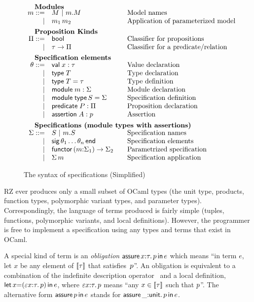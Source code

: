 \begin{figure}
\[\begin{array}{rl@{\qquad}l}
    \noalign{\textbf{Modules}}		
    \om ::= 
    & \oM  \obar \oselect{\om}{\oM}&\mbox{Model names}\\
    | & \oapp{\om_1}{\om_2}&\mbox{Application of parameterized model}\\[5pt]
    
    \noalign{\textbf{Proposition Kinds}}
    \opt ::=
    & \oProp & \mbox{Classifier for propositions}\\
    |& \oarrow{\oty}{\opt} & \mbox{Classifier for a predicate/relation}\\[5pt] 
    
    \noalign{\textbf{Specification elements}}
    \ote ::=
    & \ovalspec{\ox}{\oty}&\mbox{Value declaration}\\
    | & \otyspec{\oTY}&\mbox{Type declaration}\\
    | & \otydef{\oTY}{\oty}&\mbox{Type definition}\\
    | & \omodulespec{\om}{\omt}&\mbox{Module declaration}\\
    | & \osignatdef{\oMT}{\omt}&\mbox{Specification definition}\\
    | & \opropspec{\oP}{\opt}&\mbox{Proposition declaration}\\
    | & \oassertion{\oA}{\op}&\mbox{Assertion}\\[5pt]

    \noalign{\textbf{Specifications (module types with assertions)}}
    \omt ::= 
    & \oMT \obar \oselect{\om}{\oMT} & \mbox{Specification names}\\
    | & \osig{\ote_1 \ldots \ote_n} & \mbox{Specification elements}\\
    | & \ofunctor{\om}{\omt_1}{\omt_2} & \mbox{Parametrized specification}\\
    | & \oapp{\omt}{\om} & \mbox{Specification application}
  \end{array}
  \]
  \label{fig:output}
  \caption{The syntax of specifications (Simplified)}
\end{figure}

RZ ever produces only a small subset of OCaml types (the unit type,
products, function types, polymorphic variant types, and parameter
types). Correspondingly, the language of terms produced is fairly simple
(tuples, functions, polymorphic variants, and local definitions).
However, the programmer is free to implement a specification using any
types and terms that exist in OCaml. 

A special kind of term is an
\emph{obligation} $\mathsf{assure}\,x{:}\tau.\,p\,\mathsf{in}\,e$ which means ``in term
$e$, let $x$ be any element of $[\![\tau]\!]$ that satisfies~$p$''.
An obligation is equivalent to a combination of the indefinite
description operator~\cite{epsilon-reference} and a local definition,
$\mathsf{let}\,x{=}(\varepsilon x {:} \tau.\,p)\,\mathsf{in}\,e$, where
$\varepsilon x {:} \tau.\, p$ means ``any $x \in [\![\tau]\!]$
such that $p$''. The alternative form $\mathsf{assure}\,p\,\mathsf{in}\,e$ stands
for $\mathsf{assure}\,\_{:}\mathsf{unit}.\,p\,\mathsf{in}\,e$. 

